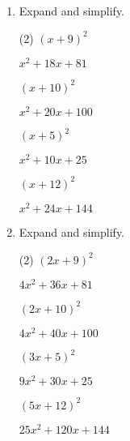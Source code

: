 \clearpage

\begin{enumerate} [leftmargin=0cm] 
\item Expand and simplify.
\begin{tasks}[label=(\alph*), after-item-skip=2pt,after-skip=3pt, label-width=4ex](2)
    \task  $ (x+ 9)^2   $    \\  \begin{envAnswer} $   x^2 +   18x +    81       $ \end{envAnswer}
    \task  $ (x+10)^2   $    \\  \begin{envAnswer} $   x^2 +   20x +   100       $ \end{envAnswer}
    \task  $ (x+ 5)^2   $    \\  \begin{envAnswer} $   x^2 +   10x +    25       $ \end{envAnswer}
    \task  $ (x+12)^2   $    \\  \begin{envAnswer} $   x^2 +   24x +   144       $ \end{envAnswer}
\end{tasks}

\item Expand and simplify.
\begin{tasks}[label=(\alph*), after-item-skip=2pt,after-skip=3pt, label-width=4ex](2)
    \task  $ (2x+ 9)^2  $    \\  \begin{envAnswer} $  4x^2 +   36x +    81       $ \end{envAnswer}
    \task  $ (2x+10)^2  $    \\  \begin{envAnswer} $  4x^2 +   40x +   100       $ \end{envAnswer}
    \task  $ (3x+ 5)^2  $    \\  \begin{envAnswer} $  9x^2 +   30x +    25       $ \end{envAnswer}
    \task  $ (5x+12)^2  $    \\  \begin{envAnswer} $ 25x^2 +  120x +   144       $ \end{envAnswer}
\end{tasks}



\end{enumerate}
